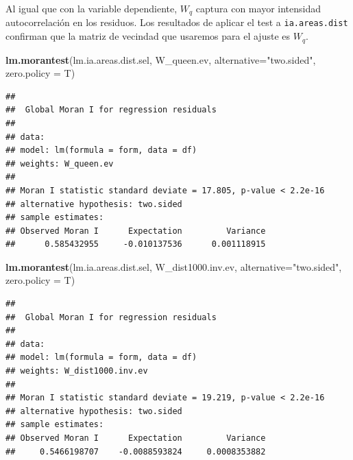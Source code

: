 \documentclass[12pt,]{book}
\newenvironment{Shaded}{\begin{snugshade}}{\end{snugshade}}
\newcommand{\KeywordTok}[1]{\textcolor[rgb]{0.13,0.29,0.53}{\textbf{#1}}}
\newcommand{\DataTypeTok}[1]{\textcolor[rgb]{0.13,0.29,0.53}{#1}}
\newcommand{\StringTok}[1]{\textcolor[rgb]{0.31,0.60,0.02}{#1}}
\newcommand{\NormalTok}[1]{#1}
\begin{document}
Al igual que con la variable dependiente, \(W_q\) captura con mayor
intensidad autocorrelación en los residuos. Los resultados de aplicar el
test a \texttt{ia.areas.dist} confirman que la matriz de vecindad que
usaremos para el ajuste es \(W_q\).

\begin{Shaded}
\begin{Highlighting}[]
\KeywordTok{lm.morantest}\NormalTok{(lm.ia.areas.dist.sel, }
\NormalTok{             W_queen.ev, }
             \DataTypeTok{alternative=}\StringTok{"two.sided"}\NormalTok{,}
             \DataTypeTok{zero.policy =}\NormalTok{ T)}
\end{Highlighting}
\end{Shaded}

\begin{verbatim}
## 
##  Global Moran I for regression residuals
## 
## data:  
## model: lm(formula = form, data = df)
## weights: W_queen.ev
## 
## Moran I statistic standard deviate = 17.805, p-value < 2.2e-16
## alternative hypothesis: two.sided
## sample estimates:
## Observed Moran I      Expectation         Variance 
##      0.585432955     -0.010137536      0.001118915
\end{verbatim}

\begin{Shaded}
\begin{Highlighting}[]
\KeywordTok{lm.morantest}\NormalTok{(lm.ia.areas.dist.sel, }
\NormalTok{             W_dist1000.inv.ev, }
             \DataTypeTok{alternative=}\StringTok{"two.sided"}\NormalTok{,}
             \DataTypeTok{zero.policy =}\NormalTok{ T)}
\end{Highlighting}
\end{Shaded}

\begin{verbatim}
## 
##  Global Moran I for regression residuals
## 
## data:  
## model: lm(formula = form, data = df)
## weights: W_dist1000.inv.ev
## 
## Moran I statistic standard deviate = 19.219, p-value < 2.2e-16
## alternative hypothesis: two.sided
## sample estimates:
## Observed Moran I      Expectation         Variance 
##     0.5466198707    -0.0088593824     0.0008353882
\end{verbatim}
\end{document}
